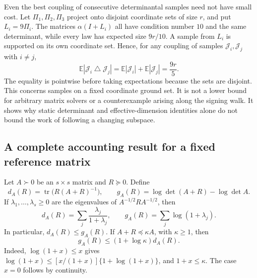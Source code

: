 \documentclass[11pt]{amsart}
\theoremstyle{definition}\newtheorem{definition}[theorem]{Definition}
\theoremstyle{remark}\newtheorem{remark}[theorem]{Remark}
\numberwithin{equation}{section}
\begin{document}
Even the best coupling of consecutive determinantal samples need not
have small cost.  Let $\Pi_1,\Pi_2,\Pi_3$ project onto disjoint coordinate
sets of size $r$, and put $L_i=9\Pi_i$.
The matrices $\alpha(I+L_i)$ all have condition number $10$ and the same
determinant, while every law has expected size $9r/10$.
A sample from $L_i$ is supported on its own coordinate set.  Hence, for
any coupling of samples $\mathcal J_i,\mathcal J_j$ with $i\ne j$,
\begin{equation}\label{reg:dpprecourse}
 \mathbb E|\mathcal J_i\mathbin\triangle\mathcal J_j|
 =\mathbb E|\mathcal J_i|+\mathbb E|\mathcal J_j|=\frac{9r}{5}.
\end{equation}
The equality is pointwise before taking expectations because the sets
are disjoint.  This concerns samples on a fixed coordinate ground set.
It is not a lower bound for arbitrary matrix solvers or a counterexample
arising along the signing walk.  It shows why static determinant and
effective-dimension identities alone do not bound the work of following
a changing subspace.


\subsection{A complete accounting result for a fixed reference matrix}

Let $A\succ0$ be an $s\times s$ matrix and $R\succeq0$.  Define
\[
 d_A(R)=\operatorname{tr}\bigl(R(A+R)^{-1}\bigr),\qquad
 g_A(R)=\log\det(A+R)-\log\det A.
\]
If $\lambda_1,\ldots,\lambda_s\ge0$ are the eigenvalues of
$A^{-1/2}RA^{-1/2}$, then
\[
 d_A(R)=\sum_j\frac{\lambda_j}{1+\lambda_j},\qquad
 g_A(R)=\sum_j\log(1+\lambda_j).
\]
In particular, $d_A(R)\le g_A(R)$.  If $A+R\preceq\kappa A$,
with $\kappa\ge1$, then
\begin{equation}\label{regmaint:detdim}
 g_A(R)\le (1+\log\kappa)d_A(R).
\end{equation}
Indeed, $\log(1+x)\le x$ gives
$\log(1+x)\le [x/(1+x)]\{1+\log(1+x)\}$, and
$1+x\le\kappa$.  The case $x=0$ follows by continuity.
\end{document}

